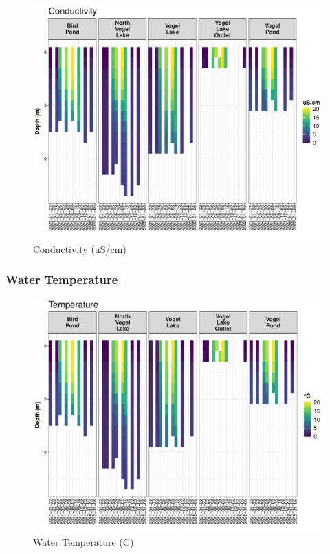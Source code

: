 \documentclass[
]{book}
\begin{document}
\begin{figure}
\centering
\includegraphics{Miller_Creek_Vogel_Lake_Water_Quality_files/figure-latex/unnamed-chunk-13-1.pdf}
\caption{\label{fig:unnamed-chunk-13}Conductivity (uS/cm)}
\end{figure}

\hypertarget{water-temperature}{%
\subsubsection{Water Temperature}\label{water-temperature}}

\begin{figure}
\centering
\includegraphics{Miller_Creek_Vogel_Lake_Water_Quality_files/figure-latex/unnamed-chunk-14-1.pdf}
\caption{\label{fig:unnamed-chunk-14}Water Temperature (C)}
\end{figure}
\end{document}
